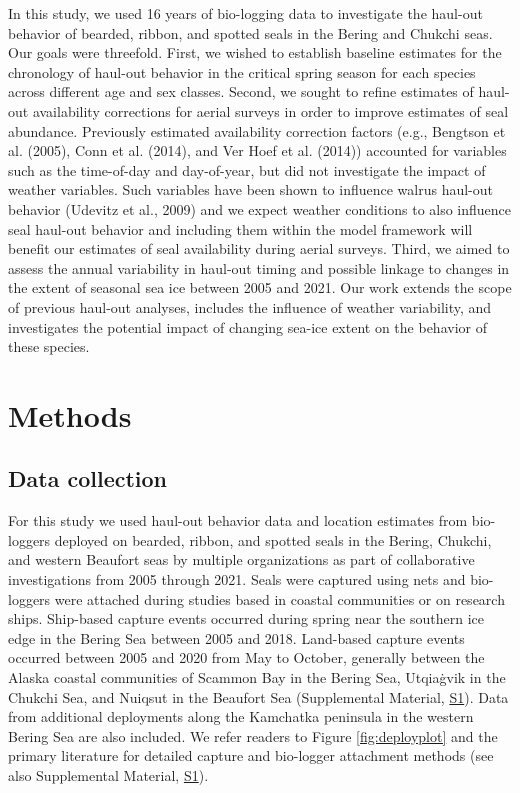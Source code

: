 \documentclass[fleqn,10pt,lineno]{wlpeerj} %
\begin{document}
In this study, we used 16 years of bio-logging data to investigate the haul-out
behavior of bearded, ribbon, and spotted seals in the Bering and Chukchi seas.
Our goals were threefold. First, we wished to establish baseline estimates for
the chronology of haul-out behavior in the critical spring season for each
species across different age and sex classes. Second, we sought to refine
estimates of haul-out availability corrections for aerial surveys in order to
improve estimates of seal abundance. Previously estimated availability
correction factors (e.g., Bengtson et al. (2005), Conn et al. (2014), and Ver Hoef et al. (2014))
accounted for variables such as the time-of-day and day-of-year, but did not
investigate the impact of weather variables. Such variables have been
shown to influence walrus haul-out behavior (Udevitz et al., 2009) and we expect weather
conditions to also influence seal haul-out behavior and including them within
the model framework will benefit our estimates of seal availability during
aerial surveys. Third, we aimed to assess the annual variability in haul-out
timing and possible linkage to changes in the extent of seasonal sea ice between
2005 and 2021. Our work extends the scope of previous haul-out analyses,
includes the influence of weather variability, and investigates the
potential impact of changing sea-ice extent on the behavior of these species.

\hypertarget{methods}{%
\section*{Methods}\label{methods}}

\hypertarget{data-collection}{%
\subsection*{Data collection}\label{data-collection}}

For this study we used haul-out behavior data and location estimates from
bio-loggers deployed on bearded, ribbon, and spotted seals in the Bering,
Chukchi, and western Beaufort seas by multiple organizations as part of
collaborative investigations from 2005 through 2021. Seals were captured using
nets and bio-loggers were attached during studies based in coastal communities
or on research ships. Ship-based capture events occurred during spring near the
southern ice edge in the Bering Sea between 2005 and 2018. Land-based capture
events occurred between 2005 and 2020 from May to October, generally between the
Alaska coastal communities of Scammon Bay in the Bering Sea, Utqiaġvik
in the Chukchi Sea, and Nuiqsut in the Beaufort Sea (Supplemental
Material, \protect\hyperlink{s1}{S1}). Data from additional
deployments along the Kamchatka peninsula in the western Bering Sea are also
included. We refer readers to Figure \ref{fig:deployplot} and the primary literature
for detailed capture and bio-logger attachment methods (see also Supplemental
Material, \protect\hyperlink{s1}{S1}).
\end{document}
